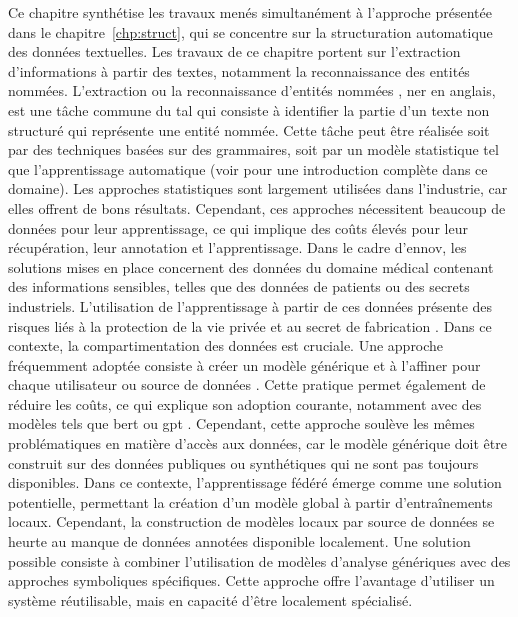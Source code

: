 Ce chapitre synthétise les travaux menés simultanément à l'approche présentée dans le chapitre~\ref{chp:struct}, qui se concentre sur la structuration automatique des données textuelles.
Les travaux de ce chapitre portent sur l'extraction d'informations à partir des textes, notamment la reconnaissance des entités nommées.
L'extraction ou la reconnaissance d'entités nommées \cite{patel-schneiderUsingDescriptionLogics2015}, \gls{ner} en anglais, est une tâche commune du \gls{tal} qui consiste à identifier la partie d'un texte non structuré qui représente une entité nommée.
Cette tâche peut être réalisée soit par des techniques basées sur des grammaires, soit par un modèle statistique tel que l'apprentissage automatique (voir \cite{jurafskySpeechLanguageProcessing2009} pour une introduction complète dans ce domaine).
Les approches statistiques sont largement utilisées dans l'industrie, car elles offrent de bons résultats.
Cependant, ces approches nécessitent beaucoup de données pour leur apprentissage, ce qui implique des coûts élevés pour leur récupération, leur annotation et l'apprentissage.
Dans le cadre d'\gls{ennov}, les solutions mises en place concernent des données du domaine médical contenant des informations sensibles, telles que des données de patients ou des secrets industriels.
L'utilisation de l'apprentissage à partir de ces données présente des risques liés à la protection de la vie privée et au secret de fabrication \cite{fredriksonModelInversionAttacks2015,songPrivacyRisksSecuring2019}.
Dans ce contexte, la compartimentation des données est cruciale.
Une approche fréquemment adoptée consiste à créer un modèle générique et à l'affiner pour chaque utilisateur ou source de données \cite{ribeiroWhyShouldTrust2016}.
Cette pratique permet également de réduire les coûts, ce qui explique son adoption courante, notamment avec des modèles tels que \gls{bert} \cite{devlinBERTPretrainingDeep2019} ou \gls{gpt} \cite{radfordImprovingLanguageUnderstanding2018, brownLanguageModelsAre2020}.
Cependant, cette approche soulève les mêmes problématiques en matière d'accès aux données, car le modèle générique doit être construit sur des données publiques ou synthétiques qui ne sont pas toujours disponibles.
Dans ce contexte, l'apprentissage fédéré émerge comme une solution potentielle, permettant la création d'un modèle global à partir d'entraînements locaux.
Cependant, la construction de modèles locaux par source de données se heurte au manque de données annotées disponible localement.
Une solution possible consiste à combiner l'utilisation de modèles d'analyse génériques avec des approches symboliques spécifiques.
Cette approche offre l'avantage d'utiliser un système réutilisable, mais en capacité d'être localement spécialisé.

